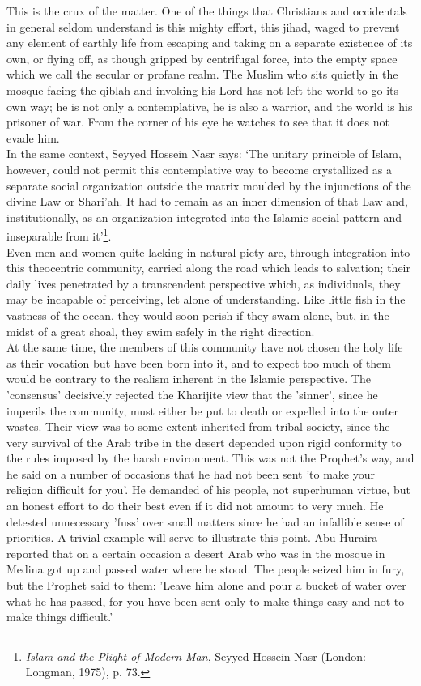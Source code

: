 \documentclass[10pt, twoside,openright]{book}
\begin{document}
This is the crux of the matter. One of the things that Christians and occidentals in general seldom 
understand is this mighty effort, this jihad, waged to prevent any element of earthly life from 
escaping and taking on a separate existence of its own, or flying off, as though gripped by 
centrifugal force, into the empty space which we call the secular or profane realm. The Muslim who 
sits quietly in the mosque facing the qiblah and invoking his Lord has not left the world to go its 
own way; he is not only a contemplative, he is also a warrior, and the world is his prisoner of war. 
From the corner of his eye he watches to see that it does not evade him. \\

In the same context, Seyyed Hossein Nasr says: `The unitary principle of Islam, however, could not 
permit this contemplative way to become crystallized as a separate social organization outside the 
matrix moulded by the injunctions of the divine Law or Shari'ah. It had to remain as an inner 
dimension of that Law and, institutionally, as an organization integrated into the Islamic social 
pattern and inseparable from it'\footnote{\emph{Islam and the Plight of Modern Man}, Seyyed Hossein Nasr (London: Longman, 1975), p. 73.}.\\

Even men and women quite lacking in natural piety are, through integration into this theocentric 
community, carried along the road which leads to salvation; their daily lives penetrated by a 
transcendent perspective which, as individuals, they may be incapable of perceiving, let alone of 
understanding. Like little fish in the vastness of the ocean, they would soon perish if they swam 
alone, but, in the midst of a great shoal, they swim safely in the right direction. \\

At the same time, the members of this community have not chosen the holy life as their vocation but 
have been born into it, and to expect too much of them would be contrary to the realism inherent in 
the Islamic perspective. The 'consensus' decisively rejected the Kharijite view that the 'sinner', 
since he imperils the community, must either be put to death or expelled into the outer wastes. Their 
view was to some extent inherited from tribal society, since the very survival of the Arab tribe in 
the desert depended upon rigid conformity to the rules imposed by the harsh environment. This was not 
the Prophet's way, and he said on a number of occasions that he had not been sent 'to make your 
religion difficult for you'. He demanded of his people, not superhuman virtue, but an honest effort 
to do their best even if it did not amount to very much. He detested unnecessary 'fuss' over small 
matters since he had an infallible sense of priorities. A trivial example will serve to illustrate 
this point. Abu Huraira reported that on a certain occasion a desert Arab who was in the mosque in 
Medina got up and passed water where he stood. The people seized him in fury, but the Prophet said to 
them: 'Leave him alone and pour a bucket of water over what he has passed, for you have been sent 
only to make things easy and not to make things difficult.' \\
\end{document}
